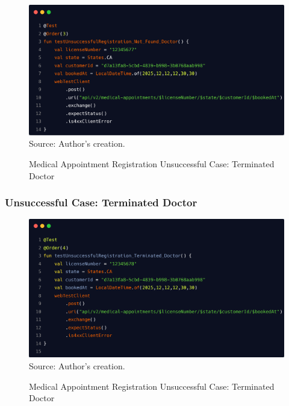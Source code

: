 \begin{figure}[H]
	\centering
	\caption{Medical Appointment Registration Unsuccessful Case: Terminated Doctor}
	\includegraphics[width=1\linewidth]{figures/medical_appointment_registration_integration_test_unsuccessful_case_doctor_not_found.png}
	\label{fig:/medical_appointment_registration_integration_test_unsuccessful_case_doctor_not_found}
	\footnotesize Source: Author's creation.
\end{figure}

\subsubsection{Unsuccessful Case: Terminated Doctor}

\begin{figure}[H]
	\centering
	\caption{Medical Appointment Registration Unsuccessful Case: Terminated Doctor}
	\includegraphics[width=1\linewidth]{figures/medical_appointment_registration_integration_test_unsuccessful_case_terminated_doctor.png}
	\label{fig:medical_appointment_registration_integration_test_unsuccessful_case_terminated_doctor}
	\footnotesize Source: Author's creation.
\end{figure}

